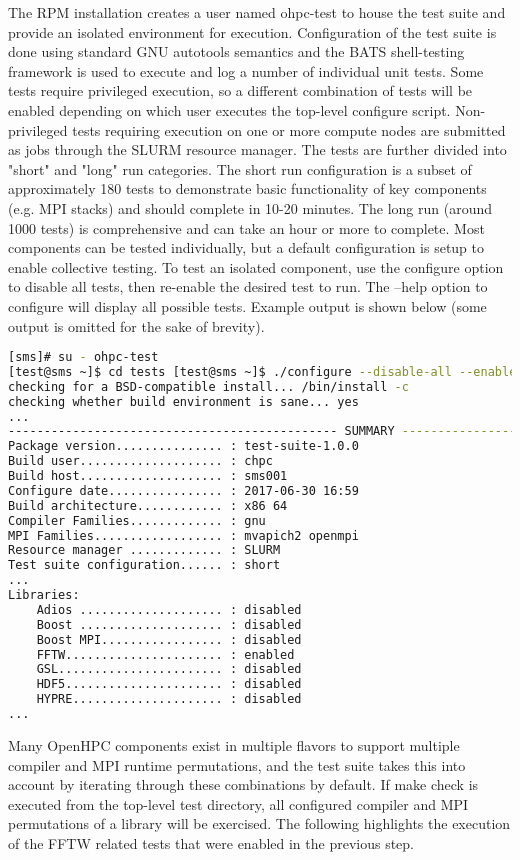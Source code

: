 The RPM installation creates a user named ohpc-test to house the test suite and provide an isolated environment for execution. Configuration of the test suite is done using standard GNU autotools semantics and the BATS shell-testing framework is used to execute and log a number of individual unit tests. Some tests require privileged execution, so a different combination of tests will be enabled depending on which user executes the top-level configure script. Non-privileged tests requiring execution on one or more compute nodes are submitted as jobs through the SLURM resource manager. The tests are further divided into "short" and "long" run categories. The short run configuration is a subset of approximately 180 tests to demonstrate basic functionality of key components (e.g. MPI stacks) and should complete in 10-20 minutes. The long run (around 1000 tests) is comprehensive and can take an hour or more to complete. Most components can be tested individually, but a default configuration is setup to enable collective testing. To test an isolated component, use the configure option to disable all tests, then re-enable the desired test to run. The --help option to configure will display all possible tests. Example output is shown below (some output is omitted for the sake of brevity).
\begin{lstlisting}[language=bash,keywords={},upquote=true]
[sms]# su - ohpc-test 
[test@sms ~]$ cd tests [test@sms ~]$ ./configure --disable-all --enable-fftw 
checking for a BSD-compatible install... /bin/install -c 
checking whether build environment is sane... yes 
... 
---------------------------------------------- SUMMARY --------------------------------------------
Package version............... : test-suite-1.0.0
Build user.................... : chpc
Build host.................... : sms001 
Configure date................ : 2017-06-30 16:59
Build architecture............ : x86 64 
Compiler Families............. : gnu 
MPI Families.................. : mvapich2 openmpi 
Resource manager ............. : SLURM 
Test suite configuration...... : short 
... 
Libraries: 
	Adios .................... : disabled 
	Boost .................... : disabled 
	Boost MPI................. : disabled 
	FFTW...................... : enabled 
	GSL....................... : disabled 
	HDF5...................... : disabled 
	HYPRE..................... : disabled 
...
\end{lstlisting}
	
Many OpenHPC components exist in multiple flavors to support multiple compiler and MPI runtime permutations, and the test suite takes this into account by iterating through these combinations by default.
If make check is executed from the top-level test directory, all configured compiler and MPI permutations of a library will be exercised. The following highlights the execution of the FFTW related tests that were enabled in the previous step.

